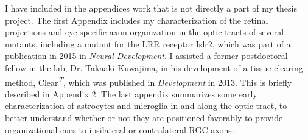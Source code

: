 I have included in the appendices work that is not directly a part of my thesis project.
The first Appendix includes my characterization of the retinal projections and eye-specific axon organization in the optic tracts of several mutants, including a mutant for the LRR receptor Islr2, which was part of a publication in 2015 in \emph{Neural Development}.
I assisted a former postdoctoral fellow in the lab, Dr. Takaaki Kuwajima, in his development of a tissue clearing method, Clear\textsuperscript{\emph{T}}, which was published in \emph{Development} in 2013.
This is briefly described in Appendix 2.
The last appendix summarizes some early characterization of astrocytes and microglia in and along the optic tract, to better understand whether or not they are positioned favorably to provide organizational cues to ipsilateral or contralateral RGC axons.